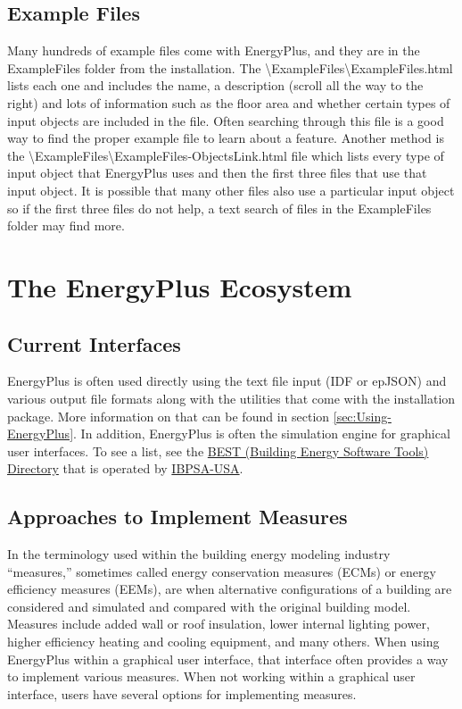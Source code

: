 \section{Example Files }

Many hundreds of example files come with EnergyPlus, and they are
in the ExampleFiles folder from the installation. The \textbackslash ExampleFiles\textbackslash ExampleFiles.html
lists each one and includes the name, a description (scroll all the
way to the right) and lots of information such as the floor area and
whether certain types of input objects are included in the file. Often
searching through this file is a good way to find the proper example
file to learn about a feature. Another method is the \textbackslash ExampleFiles\textbackslash ExampleFiles-ObjectsLink.html
file which lists every type of input object that EnergyPlus uses and
then the first three files that use that input object. It is possible
that many other files also use a particular input object so if the
first three files do not help, a text search of files in the ExampleFiles
folder may find more. 

\chapter{The EnergyPlus Ecosystem }

\section{Current Interfaces }

EnergyPlus is often used directly using the text file input (IDF or
epJSON) and various output file formats along with the utilities that
come with the installation package. More information on that can be
found in section \ref{sec:Using-EnergyPlus}. In addition, EnergyPlus is often
the simulation engine for graphical user interfaces. To see a list,
see the \href{https://www.buildingenergysoftwaretools.com/}{BEST (Building Energy Software Tools) Directory}
that is operated by \href{https://www.ibpsa.us/}{IBPSA-USA}. 

\section{Approaches to Implement Measures }

In the terminology used within the building energy modeling industry
``measures,'' sometimes called energy conservation measures (ECMs)
or energy efficiency measures (EEMs), are when alternative configurations
of a building are considered and simulated and compared with the original
building model. Measures include added wall or roof insulation, lower
internal lighting power, higher efficiency heating and cooling equipment,
and many others. When using EnergyPlus within a graphical user interface,
that interface often provides a way to implement various measures.
When not working within a graphical user interface, users have several
options for implementing measures.

